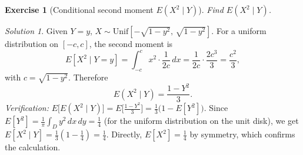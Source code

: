 \documentclass[12pt]{article}
\newtheorem{exercise}{Exercise}
\theoremstyle{remark}
\newtheorem*{solution}{Solution}
\begin{document}
\begin{exercise}[Conditional second moment $E(X^2 \mid Y)$]
Find $E(X^2 \mid Y)$.
\end{exercise}

\begin{solution}
Given $Y = y$, $X \sim \mathrm{Unif}[-\sqrt{1-y^2},\,\sqrt{1-y^2}]$.
For a uniform distribution on $[-c, c]$, the second moment is
\[
  E[X^2 \mid Y = y]
  = \int_{-c}^{c} x^2 \cdot \frac{1}{2c}\,dx
  = \frac{1}{2c} \cdot \frac{2c^3}{3}
  = \frac{c^2}{3},
\]
with $c = \sqrt{1 - y^2}$.  Therefore
\[
  \boxed{E(X^2 \mid Y) = \frac{1 - Y^2}{3}.}
\]
\textit{Verification:} $E\bigl[E(X^2 \mid Y)\bigr] = E\bigl[\frac{1-Y^2}{3}\bigr]
= \frac{1}{3}\bigl(1 - E[Y^2]\bigr)$.  Since $E[Y^2] = \frac{1}{\pi}\int_D y^2\,dx\,dy
= \frac{1}{4}$ (for the uniform distribution on the unit disk), we get
$E[X^2 \mid Y] = \frac{1}{3}(1 - \frac{1}{4}) = \frac{1}{4}$.
Directly, $E[X^2] = \frac{1}{4}$ by symmetry, which confirms the calculation.
\end{solution}
\end{document}
